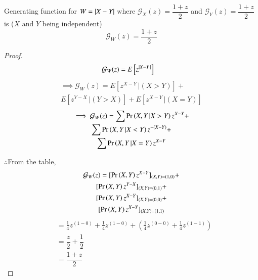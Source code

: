\documentclass[journal,12pt,twocolumn]{IEEEtran}
\begin{document}
\begin{lemma}
Generating function for $W = \vert X-Y\vert$ where $\mathcal{G}_{X}(z) =\dfrac{1+z}{2}$ and $\mathcal{G}_{Y}(z) = \dfrac{1+z}{2}$ is ($X \text{ and } Y$ being independent) $$\mathcal{G}_W(z) = \frac{1+z}{2}$$
\end{lemma}
\begin{proof}
 \begin{align}
    \mathcal{G}_W(z) &= E\left[z^{\vert X-Y\,\vert}\right]
\end{align}
\begin{multline}
\implies  \mathcal{G}_W(z) = E\left[z^{X-Y}\,|(X>Y)\right] +\\ E\left[z^{Y-X}\,|(Y>X)\right] + E\left[z^{X-Y}\,|(X=Y)\right]
\end{multline}
\begin{multline}
\implies  \mathcal{G}_W(z) = \sum\Pr\left(X,Y\,| X>Y\right)z^{X-Y} + \\\sum\Pr\left(X,Y\,| X<Y\right)z^{-(X-Y)} + \\\sum\Pr\left(X,Y\,| X=Y\right) z^{X-Y}
\end{multline}
\begin{center}
\begin{table}[h]
    \centering
    \caption{\large Probability Table for $(X,Y)$ in different cases.}
    \label{Table 1}
\end{table}
\end{center}
$\therefore$From the table,
\begin{multline}
    \mathcal{G}_W(z) = [\pr{X,Y}z^{X-Y}]_{(X,Y)=(1,0)} +\\ [\pr{X,Y}z^{Y-X}]_{(X,Y)=(0,1)} +\\ [\pr{X,Y}z^{X-Y}]_{(X,Y)=(0,0)} +\\ [\pr{X,Y}z^{X-Y}]_{(X,Y)=(1,1)}
\end{multline}
\begin{align}
    &= \frac{1}{4}z^{(1-0)} + \frac{1}{4}z^{(1-0)}+\left(\frac{1}{4}z^{(0-0)} + \frac{1}{4}z^{(1-1)}\right)\\
   &= \dfrac{z}{2} + \dfrac{1}{2}\\
   &= \dfrac{1+z}{2}
\end{align}
\end{proof}
\end{document}
